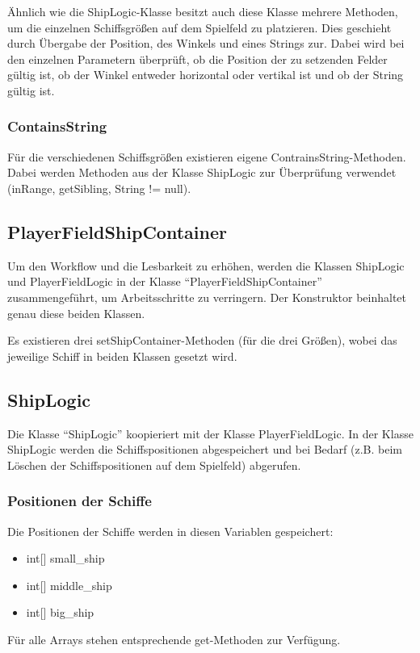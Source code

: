 \documentclass[11pt]{article} %
\begin{document}
Ähnlich wie die ShipLogic-Klasse besitzt auch diese Klasse mehrere Methoden, um die einzelnen Schiffsgrößen auf dem Spielfeld zu platzieren. Dies geschieht durch Übergabe der Position, des Winkels und eines Strings zur. Dabei wird bei den einzelnen Parametern überprüft, ob die Position der zu setzenden Felder gültig ist, ob der Winkel entweder horizontal oder vertikal ist und ob der String gültig ist.

\subsubsection{ContainsString}
Für die verschiedenen Schiffsgrößen existieren eigene ContrainsString-Methoden. Dabei werden Methoden aus der Klasse ShipLogic zur Überprüfung verwendet (inRange, getSibling, String != null).

\subsection{PlayerFieldShipContainer}
Um den Workflow und die Lesbarkeit zu erhöhen, werden die Klassen ShipLogic und PlayerFieldLogic in der Klasse \enquote{PlayerFieldShipContainer} zusammengeführt, um Arbeitsschritte zu verringern. Der Konstruktor beinhaltet genau diese beiden Klassen.

Es existieren drei setShipContainer-Methoden (für die drei Größen), wobei das jeweilige Schiff in beiden Klassen gesetzt wird.

\subsection{ShipLogic}
Die Klasse \enquote{ShipLogic} koopieriert mit der Klasse PlayerFieldLogic. In der Klasse ShipLogic werden die Schiffspositionen abgespeichert und bei Bedarf (z.B. beim Löschen der Schiffspositionen auf dem Spielfeld) abgerufen.

\subsubsection{Positionen der Schiffe}
Die Positionen der Schiffe werden in diesen Variablen gespeichert:
\begin{itemize}
\item int[] small\_ship
\item int[] middle\_ship
\item int[] big\_ship
\end{itemize}

Für alle Arrays stehen entsprechende get-Methoden zur Verfügung.
\end{document}
